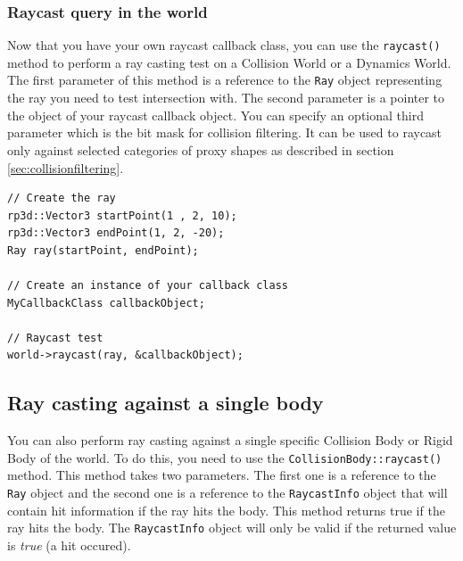 \documentclass[a4paper,12pt]{article}
\begin{document}
    \subsubsection{Raycast query in the world}

    Now that you have your own raycast callback class, you can use the \texttt{raycast()} method to perform a ray casting test
    on a Collision World or a Dynamics World. \\

    The first parameter of this method is a reference to the \texttt{Ray} object representing the ray you need to test intersection with. The second parameter is a pointer to
    the object of your raycast callback object. You can specify an optional third parameter which is the bit mask for collision filtering.
    It can be used to raycast only against selected categories of proxy shapes as described in section \ref{sec:collisionfiltering}. \\

    \begin{lstlisting}
// Create the ray
rp3d::Vector3 startPoint(1 , 2, 10);
rp3d::Vector3 endPoint(1, 2, -20);
Ray ray(startPoint, endPoint);

// Create an instance of your callback class
MyCallbackClass callbackObject;

// Raycast test
world->raycast(ray, &callbackObject);
    \end{lstlisting}

    \vspace{0.6cm}

    \subsection{Ray casting against a single body}

    \begin{sloppypar}

    You can also perform ray casting against a single specific Collision Body or Rigid Body of the world. To do this, you need to use the
    \texttt{CollisionBody::raycast()} method. This method takes two parameters. The first one is a reference to the \texttt{Ray} object and the second one
    is a reference to the \texttt{RaycastInfo} object that will contain hit information if the ray hits the body. This method returns true if the ray hits the
    body. The \texttt{RaycastInfo} object will only be valid if the returned value is \emph{true} (a hit occured). \\

    \end{sloppypar}
\end{document}
